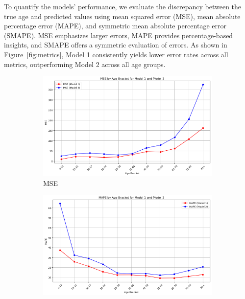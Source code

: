 \documentclass[10pt]{article}
\begin{document}
To quantify the models' performance, we evaluate the discrepancy between the true age and predicted values using mean squared error (MSE), mean absolute percentage error (MAPE), and symmetric mean absolute percentage error (SMAPE). MSE emphasizes larger errors, MAPE provides percentage-based insights, and SMAPE offers a symmetric evaluation of errors. As shown in Figure~\ref{fig:metrics}, Model 1 consistently yields lower error rates across all metrics, outperforming Model 2 across all age groups.


\begin{figure}[ht]
    \centering
    \begin{subfigure}{0.32\textwidth}
        \centering
        \includegraphics[width=\textwidth]{images/4_MSE.png}
        \caption{MSE}
        \label{fig:mse}
    \end{subfigure}
    \hfill
    \begin{subfigure}{0.32\textwidth}
        \centering
        \includegraphics[width=\textwidth]{images/4_MAPE.png}

\end{subfigure}
\end{figure}
\end{document}
